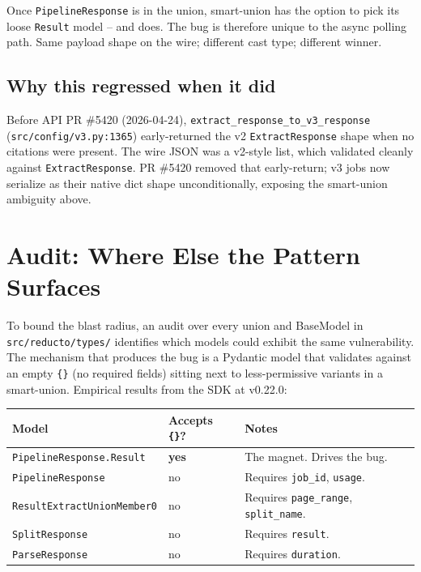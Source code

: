 \documentclass[11pt]{article}
\begin{document}
Once \texttt{PipelineResponse} is in the union, smart-union has the option to pick its loose \texttt{Result} model -- and does. The bug is therefore unique to the async polling path. Same payload shape on the wire; different cast type; different winner.

\subsection{Why this regressed when it did}

Before API PR \#5420 (2026-04-24), \texttt{extract\_response\_to\_v3\_response} (\texttt{src/config/v3.py:1365}) early-returned the v2 \texttt{ExtractResponse} shape when no citations were present. The wire JSON was a v2-style list, which validated cleanly against \texttt{ExtractResponse}. PR \#5420 removed that early-return; v3 jobs now serialize as their native dict shape unconditionally, exposing the smart-union ambiguity above.

\section{Audit: Where Else the Pattern Surfaces}

To bound the blast radius, an audit over every union and BaseModel in \texttt{src/reducto/types/} identifies which models could exhibit the same vulnerability. The mechanism that produces the bug is a Pydantic model that validates against an empty \texttt{\{\}} (no required fields) sitting next to less-permissive variants in a smart-union. Empirical results from the SDK at v0.22.0:

\begin{center}
\begin{tabular}{@{}lll@{}}
\toprule
\textbf{Model}                                    & \textbf{Accepts \texttt{\{\}}?} & \textbf{Notes} \\
\midrule
\texttt{PipelineResponse.Result}                  & \textbf{yes}                    & The magnet. Drives the bug. \\
\texttt{PipelineResponse}                         & no                              & Requires \texttt{job\_id}, \texttt{usage}. \\
\texttt{ResultExtractUnionMember0}                & no                              & Requires \texttt{page\_range}, \texttt{split\_name}. \\
\texttt{SplitResponse}                            & no                              & Requires \texttt{result}. \\
\texttt{ParseResponse}                            & no                              & Requires \texttt{duration}. \\
\bottomrule
\end{tabular}
\end{center}
\end{document}
